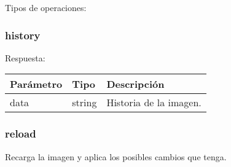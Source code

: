 		Tipos de operaciones:
		
			\subsubsection{history}
				Respuesta:
				
				\begin{table}[!h]
					\centering
	\begin{adjustbox}{max width=\textwidth}
					\begin{tabular}{|l|l|l|}
						\hline
						Parámetro & Tipo & Descripción \\ \hline
						data & string & Historia de la imagen. \\ \hline
					\end{tabular}
\end{adjustbox}
				\end{table}
			
			\subsubsection{reload}
				Recarga la imagen y aplica los posibles cambios que tenga.
		
		
	



